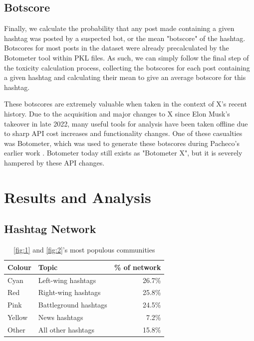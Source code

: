 \documentclass[a4paper,11pt]{article}  %
\begin{document}
	\subsection{Botscore}
	\label{subsec:botscore}
	Finally, we calculate the probability that any post made containing a given hashtag was posted by a suspected bot, or the mean "botscore" of the hashtag.
	Botscores for most posts in the dataset were already precalculated by the Botometer tool \parencite{sayyadiharikandehDetectionNovelSocial2020} within PKL files. As such, we can simply follow the final step of the toxicity calculation process, collecting the botscores for each post containing a given hashtag and calculating their mean to give an average botscore for this hashtag.

	These botscores are extremely valuable when taken in the context of X's recent history. Due to the acquisition and major changes to X since Elon Musk's takeover in late 2022, many useful tools for analysis have been taken offline due to sharp API cost increases and functionality changes. One of these casualties was Botometer, which was used to generate these botscores during Pacheco's earlier work \parencite{pachecoBotsElectionsControversies2023}. Botometer today still exists as "Botometer X", but it is severely hampered by these API changes.

	\section{Results and Analysis}
	\label{sec:results}
	\subsection{Hashtag Network}
	\label{subsec:network}

	\begin{table}[h!]%
		\centering
		\begin{tabular}{||l l r||} 
			\hline
			Colour & Topic & \% of network \\ [0.5ex] 
			\hline\hline
			Cyan & Left-wing hashtags & 26.7\% \\ 
			\hline
			Red & Right-wing hashtags & 25.8\% \\
			\hline
			Pink & Battleground hashtags & 24.5\% \\
			\hline
			Yellow & News hashtags & 7.2\% \\
			\hline
			Other & All other hashtags & 15.8\% \\
			\hline
		\end{tabular}
		\caption{\autoref{fig:1} and \autoref{fig:2}'s most populous communities}
		\label{tab:1}
	\end{table}
\end{document}
